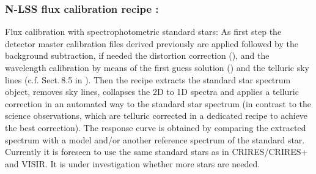 \subsubsection{N-LSS flux calibration recipe :}\label{rec:lssNflux}
Flux calibration with spectrophotometric standard stars: As first step the detector master calibration files derived previously are applied followed by the background subtraction, if needed the distortion correction (), and
the wavelength calibration by means of the first guess solution () and the telluric sky lines (c.f. Sect.\,8.5 in \cite{DRLS}). Then the recipe extracts the standard star spectrum object, removes sky lines, collapses the 2D to 1D spectra and applies a telluric correction in an automated way to the standard star spectrum (in contrast to the science observations, which are telluric corrected in a dedicated recipe to achieve the best correction). The response curve is obtained by comparing the extracted spectrum with a model and/or another reference spectrum of the standard star. Currently it is foreseen to use the same standard stars as in \ac{CRIRES}/CRIRES+ and \ac{VISIR}. It is under investigation whether more stars are needed.

